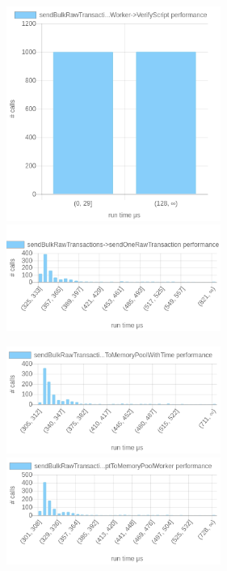 \documentclass{article}
\begin{document}
\begin{table}
	
	\includegraphics[width=7cm]{images/local/chartsendBulkRawTransactions-_3EsendOneRawTransaction-_3EAcceptToMemoryPoolWithTime-_3EAcceptToMemoryPoolWorker-_3EVerifyScript.png}
	\includegraphics[width=7cm]{images/local/chartsendBulkRawTransactions-_3EsendOneRawTransaction.png}
	
	\includegraphics[width=7cm]{images/local/chartsendBulkRawTransactions-_3EsendOneRawTransaction-_3EAcceptToMemoryPoolWithTime.png}
	\includegraphics[width=7cm]{images/local/chartsendBulkRawTransactions-_3EsendOneRawTransaction-_3EAcceptToMemoryPoolWithTime-_3EAcceptToMemoryPoolWorker.png}
	

\end{table}
\end{document}
